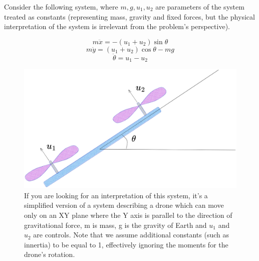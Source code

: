 \documentclass{exam}
\begin{document}
\begin{questions}

\question

  Consider the following system, where $m, g, u_1, u_2$ are parameters of the system treated as constants (representing mass, gravity and fixed forces, 
  but the physical interpretation of the system is irrelevant from the problem's perspective).

  $$m\ddot{x} = -(u_1+u_2)\sin \theta$$
  $$m\ddot{y} = (u_1+u_2)\cos \theta -mg$$
  $$\ddot{\theta} = u_1-u_2$$



\begin{figure}[!ht]
\centering
\includegraphics[scale=0.1]{drone.png}
  \caption{If you are looking for an interpretation of this system, it’s a simplified version of a system describing a drone which can move only on an XY plane where the Y axis is parallel to the direction of gravitational force, m is mass, g is the gravity of Earth and $u_1$ and $u_2$ are controls. Note that we assume additional constants (such as innertia) to be equal to 1, effectively ignoring the moments for the drone's rotation.}
\label{fig1}
\end{figure}


\end{questions}
\end{document}
